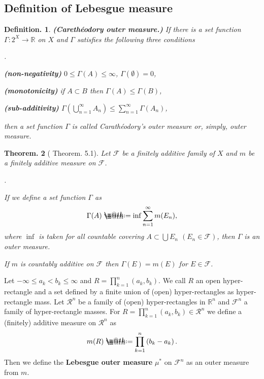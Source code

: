 \documentclass[openany, a4paper, oneside]{jsbook}
\makeatletter
\newcounter{enum2}
\renewenvironment{enumerate}{%
\begin{list}%
{%
\arabic{enum2}.\ \,%
}%
{%
\usecounter{enum2}
\setlength{\itemindent}{0pt}%
\setlength{\leftmargin}{15pt}%
\setlength{\rightmargin}{0pt}%
\setlength{\labelsep}{0pt}%
\setlength{\labelwidth}{6pt}%
\setlength{\itemsep}{0pt}%
\setlength{\parsep}{0pt}%
\setlength{\listparindent}{0pt}%
}
}{%
\end{list}%
}
\newcommand*{\defeq}{\mathrel{\rlap{%
\raisebox{0.3ex}{$\m@th\cdot$}}%
\raisebox{-0.3ex}{$\m@th\cdot$}}%
=}
\theoremstyle{break}
\theoremstyle{breakdefn}
\newtheorem{thm}{Theorem.}[section]
\newtheorem{defn}[thm]{Definition.}
\newcommand{\rbk}[1]{\left (#1\right)}
\newcommand{\bbR}{\mathbb{R}}
\newcommand{\bbRn}{\mathbb{R}^n}
\newcommand{\calF}{\mathcal{F}}
\newcommand{\calR}{\mathcal{R}}
\newcommand{\upbf}[1]{\textup{\textbf{#1}}}
\makeatother
\begin{document}
\subsection{Definition of Lebesgue measure}


\begin{defn}\upbf{(Careth\'eodory outer measure.)}
 If there is a set function $\Gamma \colon 2^X \to \bbR$ on $X$ and $\Gamma$ satisfies the following three conditions
\begin{enumerate}
\item \upbf{(non-negativity)} $0 \leq \Gamma (A) \leq \infty$, $\Gamma (\emptyset) = 0$,
\item \upbf{(monotonicity)} if $A \subset B$ then $\Gamma (A) \leq \Gamma (B)$,
\item \upbf{(sub-additivity)} $\Gamma (\bigcup_{n=1}^{\infty} A_n) \leq \sum_{n=1}^{\infty} \Gamma (A_n)$,
\end{enumerate}
 then a set function $\Gamma$ is called Carath\'eodory's outer measure or, simply, outer measure.
\end{defn}
\begin{thm}[\cite{SeizoIto1} Theorem. 5.1]
 Let $\calF$ be a finitely additive family of $X$ and $m$ be a finitely additive measure on $\calF$.
\begin{enumerate}
\item If we define a set function $\Gamma$ as
    \begin{align}
     \Gamma (A)
     \defeq
     \inf \sum_{n=1}^{\infty} m (E_n),
    \end{align}
    where $\inf$ is taken for all countable covering $A \subset \bigcup E_n$ $(E_n \in \calF)$,
    then $\Gamma$ is an outer measure.
\item If $m$ is countably additive on $\calF$ then $\Gamma (E) = m (E)$ for $E \in \calF$.
\end{enumerate}
\end{thm}
Let $- \infty \leq a_k < b_k \leq \infty$ and $R = \prod_{k=1}^{n} \rbk{a_k, b_k}$.
We call $R$ an open hyper-rectangle and a set defined by a finite union of (open) hyper-rectangles as hyper-rectangle mass.
Let $\calR^n$ be a family of (open) hyper-rectangles in $\bbRn$ and $\calF^n$ a family of hyper-rectangle masses.
For $R = \prod_{k=1}^{n} \rbk{a_k, b_k} \in \calR^n$ we define a (finitely) additive measure on $\calR^n$ as
\begin{align}
 m (R)
 \defeq
 \prod_{k=1}^n \rbk{b_k - a_k}.
\end{align}
Then we define the \upbf{Lebesgue outer measure} $\mu^*$ on $\calF^n$ as an outer measure from $m$.
\end{document}
